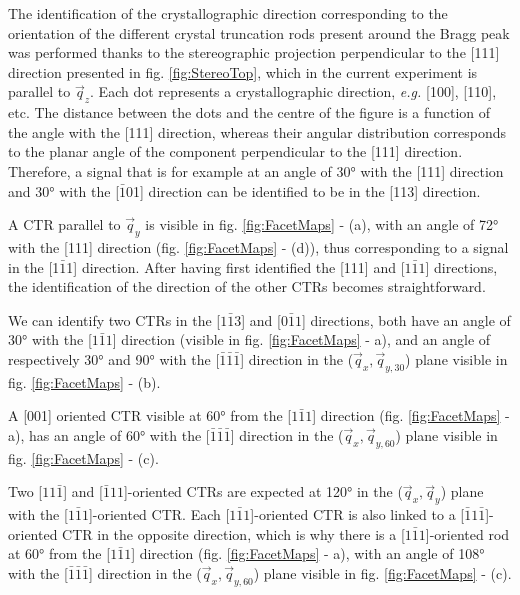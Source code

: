 The identification of the crystallographic direction corresponding to the orientation of the different crystal truncation rods present around the Bragg peak was performed thanks to the stereographic projection perpendicular to the [111] direction presented in fig. \ref{fig:StereoTop}, which in the current experiment is parallel to $\vec{q}_z$.
Each dot represents a crystallographic direction, \textit{e.g.} [100], [110], etc.
The distance between the dots and the centre of the figure is a function of the angle with the [111] direction, whereas their angular distribution corresponds to the planar angle of the component perpendicular to the [111] direction.
Therefore, a signal that is for example at an angle of \ang{30} with the [111] direction and \ang{30} with the [$\bar{1}$01] direction can be identified to be in the [113] direction.

A CTR parallel to $\vec{q}_y$ is visible in fig. \ref{fig:FacetMaps} - (a), with an angle of \ang{72} with the [111] direction (fig. \ref{fig:FacetMaps} - (d)), thus corresponding to a signal in the [1$\bar{1}$1] direction.
After having first identified the [111] and [$1\bar{1}1$] directions, the identification of the direction of the other CTRs becomes straightforward.

We can identify two CTRs in the [$1\bar{1}3$] and [$0\bar{1}1$] directions, both have an angle of \ang{30} with the [$1\bar{1}1$] direction (visible in  fig. \ref{fig:FacetMaps} - a), and an angle of respectively \ang{30} and \ang{90} with the [$\bar{1}\bar{1}\bar{1}$] direction in the ($\vec{q}_x, \vec{q}_{y, 30}$) plane visible in fig. \ref{fig:FacetMaps} - (b).

A [001] oriented CTR visible at \ang{60} from the [$1\bar{1}1$] direction (fig. \ref{fig:FacetMaps} - a), has an angle of \ang{60} with the [$\bar{1}\bar{1}\bar{1}$] direction in the ($\vec{q}_x, \vec{q}_{y, 60}$) plane visible in fig. \ref{fig:FacetMaps} - (c).

Two [$11\bar{1}$] and [$\bar{1}11$]-oriented CTRs are expected at \ang{120} in the ($\vec{q}_x, \vec{q}_y$) plane with the [$1\bar{1}1$]-oriented CTR.
Each [$1\bar{1}1$]-oriented CTR is also linked to a [$\bar{1}1\bar{1}$]-oriented CTR in the opposite direction, which is why there is a [$1\bar{1}1$]-oriented rod at \ang{60} from the [$1\bar{1}1$] direction (fig. \ref{fig:FacetMaps} - a), with an angle of \ang{108} with the [$\bar{1}\bar{1}\bar{1}$] direction in the ($\vec{q}_x, \vec{q}_{y, 60}$) plane visible in fig. \ref{fig:FacetMaps} - (c).

